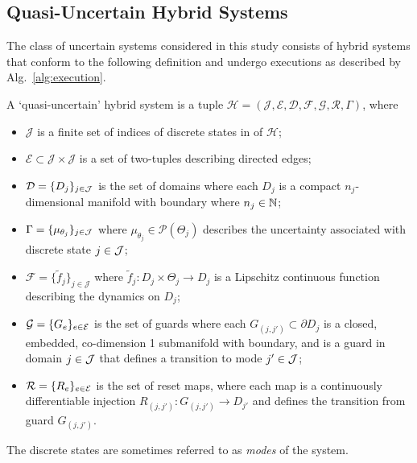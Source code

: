 \subsection{Quasi-Uncertain Hybrid Systems}
  The class of uncertain systems considered in this study consists of hybrid systems that conform to the following definition and undergo executions as described by Alg.~\ref{alg:execution}.
\begin{defn}\label{def:system}
  A `quasi-uncertain' hybrid system is a tuple \mbox{$\mathcal H=(\mathcal J,\mathcal E,\mathcal D,\mathcal F,\mathcal G,\mathcal R,\Gamma)$}, where
  \begin{itemize}
    \item $\mathcal J$ is a finite set of indices of discrete states in of $\mathcal H$;
    \item $\mathcal E\subset \mathcal J\times \mathcal J$ is a set of two-tuples describing directed edges;
    \item $\mathcal D = \{D_j\}_{j \in {\cal J}}$ is the set of domains where each $D_j$ is a compact $n_j$-dimensional manifold with boundary where $n_j \in \mathbb{N}$;
    \item $\Gamma = \{\mu_{\theta_j} \}_{j \in {\cal J}}$ where $\mu_{\theta_j}\in \mathcal P(\Theta_j)$ describes the uncertainty associated with discrete state $j \in {\cal J}$;
    \item $\mathcal F=\{\tilde f_j\}_{j\in \mathcal J}$ where $\tilde{f}_j: D_j \times \Theta_j \to D_j$ is a Lipschitz continuous function describing the dynamics on $D_j$;
    \item $\mathcal G=\{G_e\}_{e \in {\cal E}}$ is the set of guards where each $G_{(j,j')} \subset \partial D_j$ is a closed, embedded, co-dimension 1 submanifold with boundary, and is a guard in domain $j \in {\cal J}$ that defines a transition to mode $j' \in {\cal J}$;
    \item $\mathcal R = \{R_e\}_{e \in {\cal E}}$ is the set of reset maps, where each map is a continuously differentiable injection $R_{(j,j')}: G_{(j,j')} \to D_{j'}$ and defines the transition from guard $G_{(j,j')}$.
  \end{itemize}
\end{defn}
\noindent The discrete states are sometimes referred to as {\em modes} of the system.

